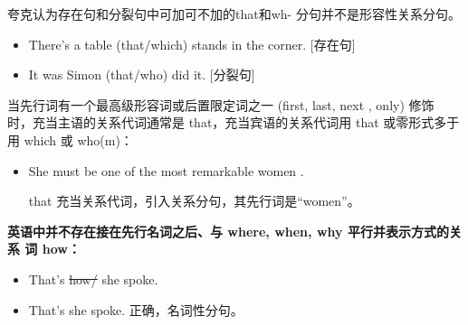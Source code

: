 夸克认为存在句和分裂句中可加可不加的that和wh- 分句并不是形容性关系分句。
\begin{itemize}
\item There's a table (that/which) stands in the corner. [存在句]

\item It was Simon (that/who) did it. [分裂句]
\end{itemize}

当先行词有一个最高级形容词或后置限定词之一 (first, last, next , only) 修饰
时，充当主语的关系代词通常是 that，充当宾语的关系代词用 that 或零形式多于
用 which 或 who(m)：
\begin{itemize}
\item She must be one of the most remarkable women .

  that 充当关系代词，引入关系分句，其先行词是“women”。
\end{itemize}

\textbf{英语中并不存在接在先行名词之后、与 where, when, why 平行并表示方式的关系
  词 how：}
\begin{itemize}

\item That's  \sout{how/} she spoke.

\item That's  she spoke. 正确，名词性分句。
\end{itemize}

